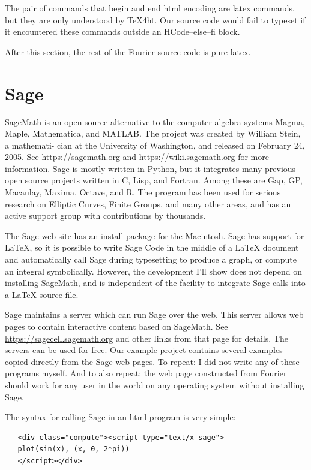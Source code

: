 \documentclass[11pt, oneside]{article}   	%
\begin{document}
The pair of commands that begin and end html encoding are latex commands, but they are only
understood by TeX4ht. Our source code would fail to typeset if it encountered these commands
outside an HCode--else--fi block. 

After this section, the rest of the Fourier source code is pure latex.

\section{Sage}

SageMath is an open source alternative to the computer algebra systems Magma, Maple,
Mathematica, and MATLAB. The project was created by William Stein, a mathemati-
cian at the University of Washington, and released on February 24, 2005. See 
\url{https://sagemath.org} and \url{https://wiki.sagemath.org} for more information. Sage is mostly written in Python,
but it integrates many previous open source projects written in C, Lisp, and Fortran.
Among these are Gap, GP, Macaulay, Maxima, Octave, and R. The program has been
used for serious research on Elliptic Curves, Finite Groups, and many other areas, and has
an active support group with contributions by thousands.

The Sage web site has an install package for the Macintosh. Sage has support for LaTeX, so
it is possible to write Sage Code in the middle of a LaTeX document and automatically call
Sage during typesetting to produce a graph, or compute an integral symbolically. However,
the development I’ll show does not depend on installing SageMath, and is independent of
the facility to integrate Sage calls into a LaTeX source file.

Sage maintains a server which can run Sage over the web. This server allows web pages
to contain interactive content based on SageMath. See \url{https://sagecell.sagemath.org}
and other links from that page for details. The servers can be used for free. Our example
project contains several examples copied directly from the Sage web pages. To repeat: I did
not write any of these programs myself. And to also repeat: the web page constructed from
Fourier should work for any user in the world on any operating system without installing
Sage.


The syntax for calling Sage in an html program is very simple:
\begin{verbatim}
   <div class="compute"><script type="text/x-sage">
   plot(sin(x), (x, 0, 2*pi))
   </script></div>
\end{verbatim}
\end{document}
